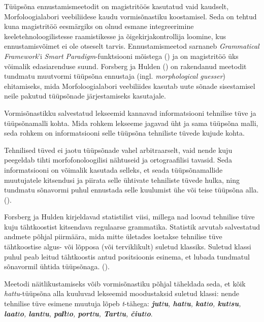 \documentclass[12pt,a4paper]{article}
\newcommand{\vadja}[1]{\textit{#1}}
\begin{document}
Tüüpsõna ennustamismeetodit on magistritöös kasutatud vaid kaudselt, Morfoloogialabori veebiliidese kaudu vormisõnastiku koostamisel. Seda on tehtud kuna magistritöö eesmärgiks on olnud esmane integreerimine keeletehnoloogilistesse raamistikesse ja õigekirjakontrollija loomine, kus ennustamisvõimet ei ole otseselt tarvis. Ennustamismeetod sarnaneb \textit{Grammatical Framework}'i \textit{Smart Paradigm}-funktsiooni mõistega (\cite{detrez_smart_2012}) ja on magistritöö üks võimalik edasiarenduse suund. Forsberg ja Hulden (\cite{forsberg_deriving_2016}) on rakendanud meetodit tundmatu muutvormi tüüpsõna ennustaja (ingl. \textit{morphological guesser}) ehitamiseks, mida Morfoloogialabori veebiliides kasutab uute sõnade sisestamisel neile pakutud tüüpsõnade järjestamiseks kasutajale.

Vormisõnastikku salvestatud lekseemid kannavad informatsiooni tehnilise tüve ja tüüpsõnamalli kohta. Mida rohkem lekseeme jagavad üht ja sama tüüpsõna malli, seda rohkem on informatsiooni selle tüüpsõna tehniliste tüvede kujude kohta.

Tehnilised tüved ei jaotu tüüpsõnade vahel arbitraarselt, vaid nende kuju peegeldab tihti morfo\-fonoloogilisi nähtuseid ja orto\-graafilisi tavasid. Seda informatsiooni on võimalik kasutada selleks, et seada tüüp\-sõna\-mallide muutujatele kitsendusi ja piirata selle ühtivate tehniliste tüvede hulka, ning tundmatu sõnavormi puhul ennustada selle kuulumist ühe või teise tüüpsõna alla. (\cite[2579]{forsberg_deriving_2016}).

Forsberg ja Hulden kirjeldavad statistilist viisi, millega nad loovad tehnilise tüve kuju tähtkoostist kitsendava regulaarse grammatika. Statistik arvutab salvestatud andmete põhjal piirmäära, mida mitte ületades loetakse tehnilise tüve tähtkoostise algus- või lõpposa (või terviklikult) suletud klassiks. Suletud klassi puhul peab leitud tähtkoostis antud positsioonis esinema, et lubada tundmatul sõnavormil ühtida tüüpsõnaga. (\cite[2580]{forsberg_deriving_2016}).

Meetodi näitlikustamiseks võib vormisõnastiku põhjal täheldada seda, et kõik \textit{hattu}-tüüpsõna alla kuuluvad lekseemid moodustaksid suletud klassi: nende tehnilise tüve esimene muutuja lõpeb \textit{t}-tähega: \vadja{\textbf{jut}t\textbf{u}, \textbf{hat}t\textbf{u}, \textbf{kat}t\textbf{o}, \textbf{kut}t\textbf{su}, \textbf{laat}t\textbf{o}, \textbf{lant}t\textbf{u}, \textbf{pal̕t}t\textbf{o}, \textbf{port}t\textbf{u}, \textbf{Tart}t\textbf{u}, \textbf{čiut}t\textbf{o}}.
\end{document}

